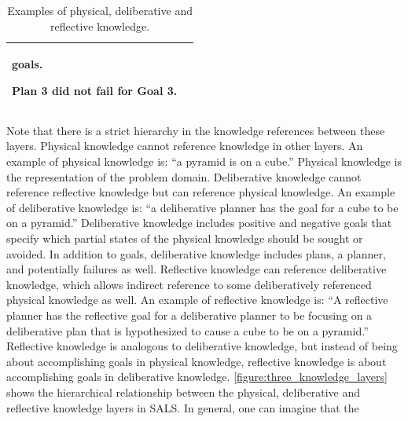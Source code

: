 \begin{table}
\begin{tabular}{|p{2cm}|p{8cm}|}
\begin{packed_itemize}
{  goals.}
\item{Plan 3 did not fail for Goal 3.}
\end{packed_itemize} \\
\hline
\end{tabular}
\caption{Examples of physical, deliberative and reflective knowledge.}
\label{table:physical_deliberative_reflective_knowledge}
\end{table}
Note that there is a strict hierarchy in the knowledge references
between these layers.  Physical knowledge cannot reference knowledge
in other layers.  An example of physical knowledge is: ``a pyramid is
on a cube.''  Physical knowledge is the representation of the problem
domain.  Deliberative knowledge cannot reference reflective knowledge
but can reference physical knowledge.  An example of deliberative
knowledge is: ``a deliberative planner has the goal for a cube to be
on a pyramid.''  Deliberative knowledge includes positive and negative
goals that specify which partial states of the physical knowledge
should be sought or avoided.  In addition to goals, deliberative
knowledge includes plans, a planner, and potentially failures as well.
Reflective knowledge can reference deliberative knowledge, which
allows indirect reference to some deliberatively referenced physical
knowledge as well.  An example of reflective knowledge is: ``A
reflective planner has the reflective goal for a deliberative planner
to be focusing on a deliberative plan that is hypothesized to cause a
cube to be on a pyramid.''  Reflective knowledge is analogous to
deliberative knowledge, but instead of being about accomplishing goals
in physical knowledge, reflective knowledge is about accomplishing
goals in deliberative knowledge.
{\autoref{figure:three_knowledge_layers}} shows the hierarchical
relationship between the physical, deliberative and reflective
knowledge layers in SALS.  In general, one can imagine that the
